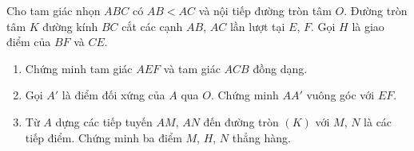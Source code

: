 \begin{ex}%
	Cho tam giác nhọn $ ABC $ có $ AB < AC $ và nội tiếp đường tròn tâm $ O $. Đường tròn tâm $ K $ đường kính $ BC $ cắt các cạnh $ AB $, $ AC $ lần lượt tại $ E $, $ F $. Gọi $ H $ là giao điểm của $ BF $ và $ CE $.
	\begin{enumerate}
		\item Chứng minh tam giác $ AEF $ và tam giác $ ACB $ đồng dạng.
		\item Gọi $ A' $ là điểm đối xứng của $ A $ qua $ O $. Chứng minh $ AA' $ vuông góc với $ EF $.
		\item Từ $ A $ dựng các tiếp tuyến $ AM $, $ AN $ đến đường tròn $ (K) $ với $ M $, $ N $ là các tiếp điểm. Chứng minh ba điểm $ M $, $ H $, $ N $ thẳng hàng.
	\end{enumerate}
\end{ex}
